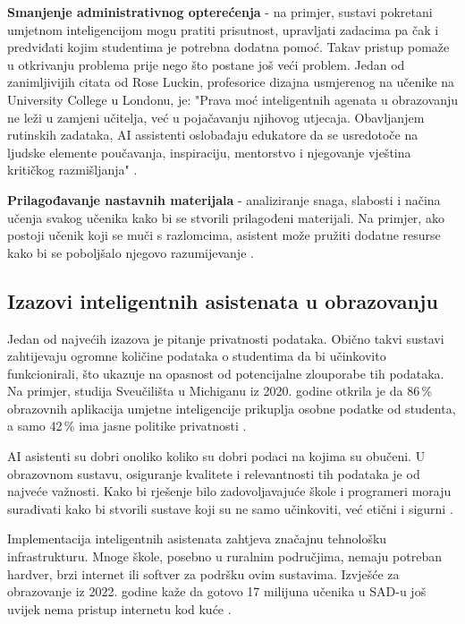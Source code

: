 \documentclass[]{foi}
\begin{document}
    \textbf{Smanjenje administrativnog opterećenja} - na primjer, sustavi pokretani umjetnom inteligencijom mogu pratiti prisutnost, upravljati zadacima pa čak i predviđati kojim
    studentima je potrebna dodatna pomoć. Takav pristup pomaže u otkrivanju problema prije nego što postane još veći problem. Jedan od zanimljivijih citata od Rose Luckin, profesorice dizajna
    usmjerenog na učenike na University College u Londonu, je: "Prava moć inteligentnih agenata u obrazovanju ne leži u zamjeni učitelja, već u pojačavanju njihovog utjecaja. Obavljanjem rutinskih
    zadataka, AI assistenti oslobađaju edukatore da se usredotoče na ljudske elemente poučavanja, inspiraciju, mentorstvo i njegovanje vještina kritičkog razmišljanja" \cite{weber2025smythos}. 
    
    \textbf{Prilagođavanje nastavnih materijala}   - analiziranje snaga, slabosti i načina učenja svakog učenika kako bi se stvorili prilagođeni materijali. Na primjer, ako postoji
    učenik koji se muči s razlomcima, asistent može pružiti dodatne resurse kako bi se poboljšalo njegovo razumijevanje \cite{weber2025smythos}.

\subsection{Izazovi inteligentnih asistenata u obrazovanju}
Jedan od najvećih izazova je pitanje privatnosti podataka. Obično takvi sustavi zahtijevaju ogromne količine podataka o studentima da bi učinkovito funkcionirali, što ukazuje na opasnost od 
potencijalne zlouporabe tih podataka. Na primjer, studija Sveučilišta u Michiganu iz 2020. godine otkrila je da 86\,\% obrazovnih aplikacija umjetne inteligencije prikuplja osobne podatke od studenta,
a samo 42\,\% ima jasne politike privatnosti \cite{weber2025smythos}.

AI asistenti su dobri onoliko koliko su dobri podaci na kojima su obučeni. U obrazovnom sustavu, osiguranje kvalitete i relevantnosti tih podataka je od najveće važnosti.
Kako bi rješenje bilo zadovoljavajuće škole i programeri moraju surađivati kako bi stvorili sustave koji su ne samo učinkoviti, već etični i sigurni \cite{weber2025smythos}.

Implementacija inteligentnih asistenata zahtjeva značajnu tehnološku infrastrukturu. Mnoge škole, posebno u ruralnim područjima, nemaju potreban hardver, brzi internet ili softver za podršku ovim sustavima.
Izvješće za obrazovanje iz 2022. godine kaže da gotovo 17 milijuna učenika u SAD-u još uvijek nema pristup internetu kod kuće \cite{weber2025smythos}.
\end{document}
